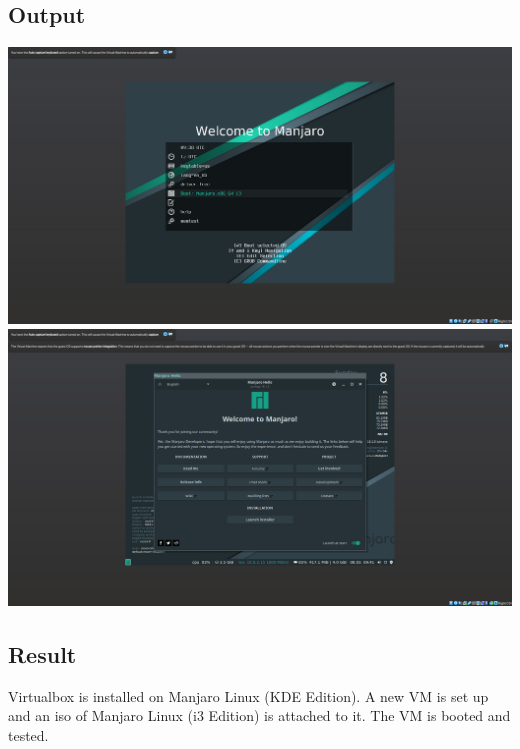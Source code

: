 \documentclass{article}
\begin{document}
\newpage

\subsection{Output}
\includegraphics[width=1.2\textwidth]{img/p26/ss7.png}
\includegraphics[width=1.2\textwidth]{img/p26/ss8.png}

\newpage

\subsection{Result}
Virtualbox is installed on Manjaro Linux (KDE Edition). A new VM is set up
and an iso of Manjaro Linux (i3 Edition) is attached to it. The VM is booted
and tested.
\end{document}
